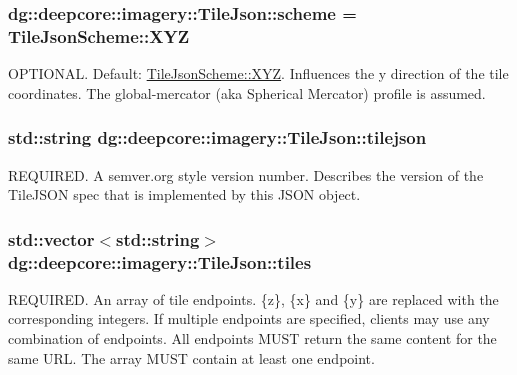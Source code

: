 \subsubsection[{\texorpdfstring{scheme}{scheme}}]{ dg\+::deepcore\+::imagery\+::\+Tile\+Json\+::scheme = {\bf Tile\+Json\+Scheme\+::\+X\+YZ}}\hypertarget{structdg_1_1deepcore_1_1imagery_1_1_tile_json_aa2b4d8a34030e5244783bac674fd6b8c}{}\label{structdg_1_1deepcore_1_1imagery_1_1_tile_json_aa2b4d8a34030e5244783bac674fd6b8c}
O\+P\+T\+I\+O\+N\+AL. Default\+: \hyperlink{namespacedg_1_1deepcore_1_1imagery_a69877eb3a0e61e72802663a976413267ae65075d550f9b5bf9992fa1d71a131be}{Tile\+Json\+Scheme\+::\+X\+YZ}. Influences the y direction of the tile coordinates. The global-\/mercator (aka Spherical Mercator) profile is assumed. 
\subsubsection[{\texorpdfstring{tilejson}{tilejson}}]{\setlength{\rightskip}{0pt plus 5cm}std\+::string dg\+::deepcore\+::imagery\+::\+Tile\+Json\+::tilejson}\hypertarget{structdg_1_1deepcore_1_1imagery_1_1_tile_json_a6eaf5b206fdf010f6c4b089d9f1dbe32}{}\label{structdg_1_1deepcore_1_1imagery_1_1_tile_json_a6eaf5b206fdf010f6c4b089d9f1dbe32}
R\+E\+Q\+U\+I\+R\+ED. A semver.\+org style version number. Describes the version of the Tile\+J\+S\+ON spec that is implemented by this J\+S\+ON object. 
\subsubsection[{\texorpdfstring{tiles}{tiles}}]{\setlength{\rightskip}{0pt plus 5cm}std\+::vector$<$std\+::string$>$ dg\+::deepcore\+::imagery\+::\+Tile\+Json\+::tiles}\hypertarget{structdg_1_1deepcore_1_1imagery_1_1_tile_json_a586d9458169760019abd61b1651c5112}{}\label{structdg_1_1deepcore_1_1imagery_1_1_tile_json_a586d9458169760019abd61b1651c5112}
R\+E\+Q\+U\+I\+R\+ED. An array of tile endpoints. \{z\}, \{x\} and \{y\} are replaced with the corresponding integers. If multiple endpoints are specified, clients may use any combination of endpoints. All endpoints M\+U\+ST return the same content for the same U\+RL. The array M\+U\+ST contain at least one endpoint. 
